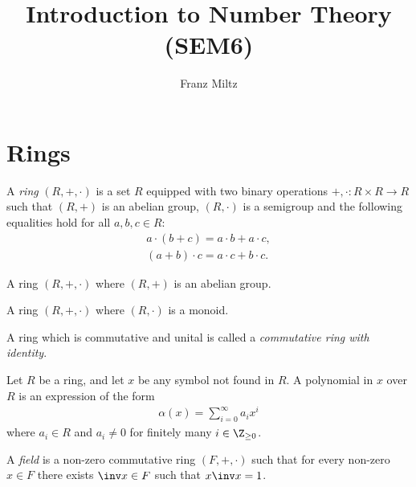 \documentclass{article}
\begin{document}
\mkthmstwounified
\title{Introduction to Number Theory (SEM6)}
\author{Franz Miltz}
\maketitle
\tableofcontents
\pagebreak

\section{Rings}

\begin{definition}[Ring]
	A \emph{ring} $(R,+,\cdot)$ is a set $R$ equipped with two binary operations
	$+,\cdot:R\times R\to R$ such that $(R,+)$ is an abelian group, $(R,\cdot)$
	is a semigroup and the following equalities hold for all $a,b,c\in R$:
	\begin{align*}
		a       \cdot (b + c)   = a \cdot b + a \cdot c, \\
		(a+b)   \cdot c         = a \cdot c + b \cdot c.
	\end{align*}
\end{definition}

\begin{definition}
	A ring $(R,+,\cdot)$ where $(R,+)$ is an abelian group.
\end{definition}

\begin{definition}
	A ring $(R,+,\cdot)$ where $(R,\cdot)$ is a monoid.
\end{definition}

\begin{definition}
	A ring which is commutative and unital is called a \emph{commutative ring
		with identity}.
\end{definition}

\begin{definition}
	Let $R$ be a ring, and let $x$ be any symbol not found in $R$. A polynomial in $x$ over $R$
	is an expression of the form
	\begin{align*}
		\alpha(x)=\sum_{i=0}^\infty a_ix^i
	\end{align*}
	where $a_i\in R$ and $a_i\neq 0$ for finitely many $i\in\Z_{\geq 0}$.
\end{definition}

\begin{definition}
	A \emph{field} is a non-zero commutative ring $(F, +, \cdot)$ such that for every non-zero
	$x\in F$ there exists $\inv x\in F$ such that $x\inv x = 1$.
\end{definition}
\end{document}
